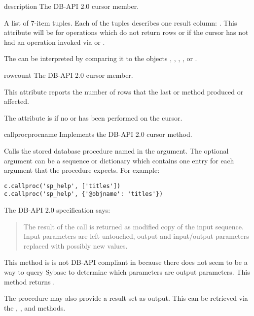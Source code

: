 \begin{memberdesc}[Cursor]{description}
The DB-API 2.0 cursor  member.

A list of 7-item tuples.  Each of the tuples describes one result
column: .  This attribute will be  for
operations which do not return rows or if the cursor has not had an
operation invoked via  or .

The  can be interpreted by comparing it to the
 objects , ,
, , or .
\end{memberdesc}

\begin{memberdesc}[Cursor]{rowcount}
The DB-API 2.0 cursor  member.

This attribute reports the number of rows that the last
 or  method produced or
affected.

The attribute is  if no  or
 has been performed on the cursor.
\end{memberdesc}

\begin{methoddesc}[Cursor]{callproc}{procname }
Implements the DB-API 2.0 cursor  method.

Calls the stored database procedure named in the 
argument. The optional  argument can be a sequence or
dictionary which contains one entry for each argument that the
procedure expects.  For example:

\begin{verbatim}
c.callproc('sp_help', ['titles'])
c.callproc('sp_help', {'@objname': 'titles'})
\end{verbatim}

The DB-API 2.0 specification says:

\begin{quote}
The result of the call is returned as modified copy of the input
sequence.  Input parameters are left untouched, output and
input/output parameters replaced with possibly new values.
\end{quote}

This method is is not DB-API compliant in because there does not seem
to be a way to query Sybase to determine which parameters are output
parameters.  This method returns .

The procedure may also provide a result set as output. This can be
retrieved via the , , and
 methods.
\end{methoddesc}

